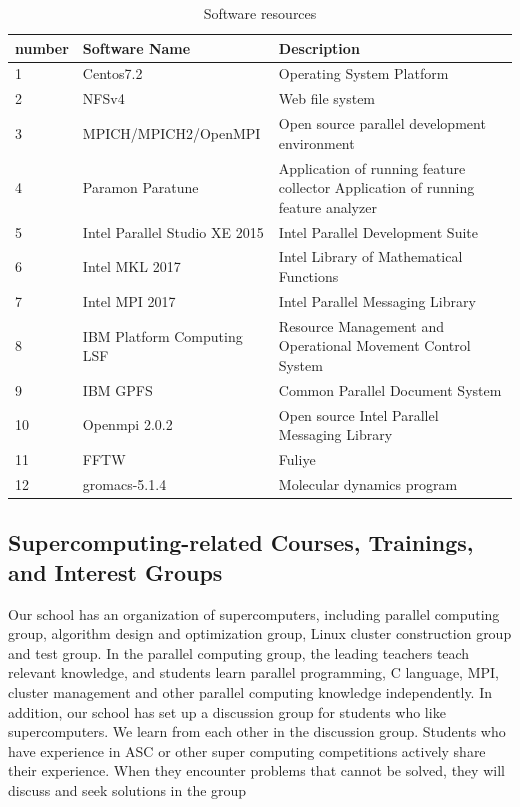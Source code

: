 \documentclass[a4paper,12pt]{article}
\begin{document}
\begin{table}[H]
\centering
\caption{Software resources}
\begin{tabular}{|l|l|l|}
\hline
number & Software Name & Description \\
\hline
1 & Centos7.2 & Operating System Platform \\
\hline
2 & NFSv4 & Web file system \\
\hline
3 & MPICH/MPICH2/OpenMPI & Open source parallel development environment \\
\hline
4 & Paramon Paratune & Application of running feature collector Application of running feature analyzer \\
\hline
5 & Intel Parallel Studio XE 2015 & Intel Parallel Development Suite \\
\hline
6 & Intel MKL 2017 & Intel Library of Mathematical Functions \\
\hline
7 & Intel MPI 2017 & Intel Parallel Messaging Library \\
\hline
8 & IBM Platform Computing LSF & Resource Management and Operational Movement Control System \\
\hline
9 & IBM GPFS & Common Parallel Document System \\
\hline
10 & Openmpi 2.0.2 & Open source Intel Parallel Messaging Library \\
\hline
11 & FFTW & Fuliye \\
\hline
12 & gromacs-5.1.4 & Molecular dynamics program \\
\hline
\end{tabular}
\end{table}


\subsection{Supercomputing-related Courses, Trainings, and Interest Groups}
Our school has an organization of supercomputers, including parallel computing group, algorithm design and optimization group, Linux cluster construction group and test group. In the parallel computing group, the leading teachers teach relevant knowledge, and students learn parallel programming, C language, MPI, cluster management and other parallel computing knowledge independently. In addition, our school has set up a discussion group for students who like supercomputers. We learn from each other in the discussion group. Students who have experience in ASC or other super computing competitions actively share their experience. When they encounter problems that cannot be solved, they will discuss and seek solutions in the group
\end{document}
